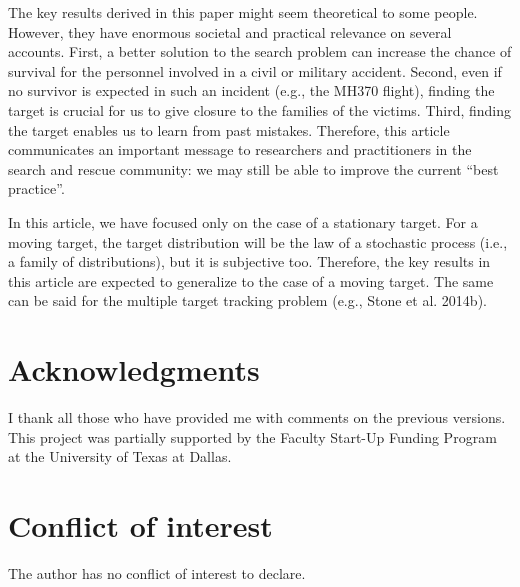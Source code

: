 \documentclass[12pt]{article}
\theoremstyle{plain}
\theoremstyle{definition}
\theoremstyle{remark}
\begin{document}
The key results derived in this paper might seem theoretical to some people. However, they have enormous societal and practical relevance on several accounts.  First,  a better solution to the search problem can increase the chance of survival for the personnel involved in a civil or military accident.  Second,  even if no survivor is expected in such an incident (e.g., the MH370 flight),  finding the target is crucial for us to give closure to the families of the victims.   Third,  finding the target enables us to learn from past mistakes.  Therefore,  this article communicates an important message to researchers and practitioners in the search and rescue community: we may still be able to improve the current ``best practice''.

In this article, we have focused only on the case of a stationary target.  For a moving target,  the target distribution will be the law of a stochastic process (i.e., a family of distributions), but it is subjective too.  Therefore,  the key results in this article are expected to generalize to the case of a moving target. The same can be said for the multiple target tracking problem (e.g.,  Stone et al. 2014b).







\section*{Acknowledgments}
I thank all those who have provided me with comments on the previous versions.  This project was partially supported by the Faculty Start-Up Funding Program at the University of Texas at Dallas.  




\section*{Conflict of interest}
The author has no conflict of interest to declare.

\end{document}
